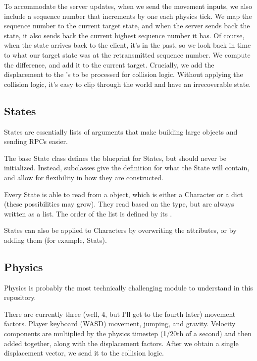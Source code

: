 \documentclass{article}
\begin{document}
To accommodate the server updates, when we send the movement inputs, we
also include a sequence number that increments by one each physics
tick. We map the sequence number to the current target state, and
when the server sends back the state, it also sends back the current
highest sequence number it has. Of course, when the state arrives back
to the client, it's in the past, so we look back in time to what our
target state was at the retransmitted sequence number. We compute the
difference, and add it to the current target. Crucially, we add the
displacement to the 's 
to be processed for collision logic. Without applying the collision logic, it's easy to clip through
the world and have an irrecoverable state.

\subsection{States}
States are essentially lists of arguments that make building large objects
and sending RPCs easier.

The base State class defines the blueprint for States, but should never be initialized.
Instead, subclasses give the definition for what the State will contain, and
allow for flexibility in how they are constructed.

Every State is able to read from a  object, which is either a Character
or a dict (these possibilities may grow). They read based on the type, but are always
written as a list. The order of the list is defined by its .

States can also be applied to Characters by overwriting the attributes, or by adding them
(for example, Stats).

\subsection{Physics}
Physics is probably the most technically challenging module to understand in this
repository.

There are currently three (well, 4, but I'll get to the fourth later) movement
factors. Player keyboard (WASD) movement, jumping, and gravity. Velocity
components are multiplied by the physics timestep (1/20th of a second) and then
added together, along with the displacement factors. After we obtain a single
displacement vector, we send it to the collision logic.
\end{document}
